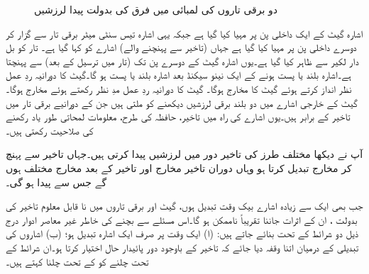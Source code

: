 \begin{figure}
\begin{subfigure}{1\textwidth}
\caption{}
\end{subfigure}
\caption{دو برقی تاروں کی لمبائی میں فرق کی بدولت پیدا لرزشیں}
\label{شکل_غیر_معاصر_لمبائی_تار_لرزش}
\end{figure}

 اشارہ  گیٹ کے ایک داخلی پن پر مہیا کیا گیا ہے جبکہ یہی اشارہ تیس سنٹی میٹر برقی تار سے گزار کر دوسرے داخلی پن پر مہیا کیا گیا ہے جہاں  (تاخیر سے پہنچنے والے) اشارے کو  کہا گیا ہے۔ تار کو بل دار لکیر سے ظاہر کیا گیا ہے۔یوں اشارہ  گیٹ کے دوسرے پن تک (تار میں ترسیل کے بعد)  سے پہنچتا ہے۔اشارہ  بلند یا پست ہونے کے ایک نینو سیکنڈ بعد اشارہ  بلند یا پست ہو گا۔گیٹ کا دورانیہ ردِ عمل نظر انداز کرتے ہوئے گیٹ کا مخارج  ہوگا۔ گیٹ کا دورانیہ ردِ عمل مدِ نظر رکھتے ہوئے مخارج  ہوگا۔گیٹ کے خارجی اشارے میں دو بلند برقی لرزشیں دیکھنے کو ملتی ہیں جن کے دورانیے برقی تار میں تاخیر کے برابر ہیں۔یوں اشارے کی راہ میں تاخیر، حافظہ کی طرح، معلومات لمحاتی طور یاد رکھنے کی صلاحیت رکھتی ہیں۔

آپ نے دیکھا مختلف طرز کی تاخیر دور میں لرزشیں پیدا کرتی ہیں۔جہاں تاخیر سے پہنچ کر مخارج تبدیل کرتا ہو وہاں دوران تاخیر مخارج اور تاخیر کے بعد مخارج مختلف ہوں گے جس سے  پیدا ہو گی۔

 جب بھی ایک سے زیادہ اشارے بیک وقت تبدیل ہوں، گیٹ اور برقی تاروں میں نا قابل معلوم تاخیر کی بدولت ، ان کے اثرات جاننا تقریباً ناممکن ہو گا۔اس مسئلے سے بچنے کی خاطر غیر معاصر ادوار درج ذیل دو شرائط کے تحت بنائے جاتے ہیں: (ا) ایک وقت پر صرف ایک اشارہ تبدیل ہو؛ (ب) اشاروں کی تبدیلی کے درمیان اتنا وقفہ دیا جائے کہ تاخیر کے باوجود دور پائیدار حال اختیار کرتا ہو۔ان شرائط کے تحت چلنے کو  کے تحت چلنا کہتے ہیں۔

